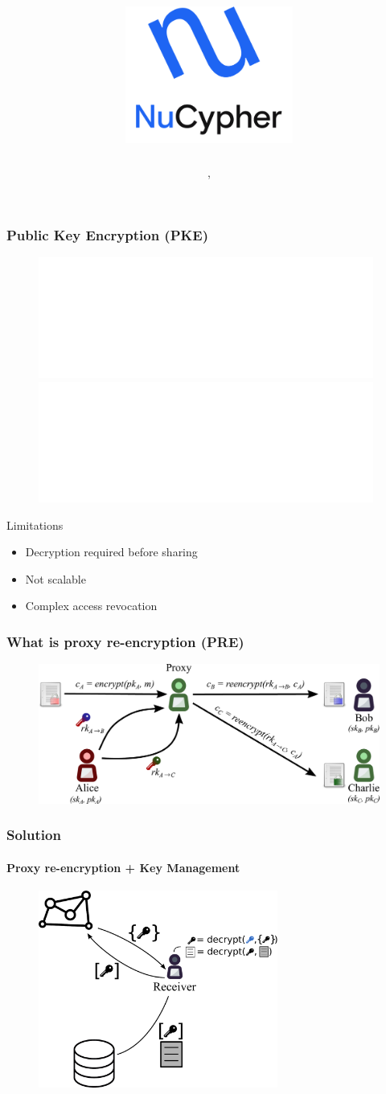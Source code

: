 \documentclass[xetex,mathsans,sans,aspectratio=169]{beamer}
\title[\titlefooter]{\includegraphics[width=5.5cm]{pdf/nucypher_logo.pdf}}
\author[\presenterfooter]{\presenter}
\date[\eventdate]{\event, \eventdate}
\begin{document}
    \begin{frame}
        \titlepage
    \end{frame}

    \begin{frame}
        \frametitle{Public Key Encryption (PKE)}
        \begin{figure}
            \centering
            \includegraphics<1>[width=11cm]{pdf/pke-multi.pdf}
            \includegraphics<2>[width=11cm]{pdf/pke-multi-hack.pdf}
        \end{figure}

        Limitations
        \begin{itemize}
            \item Decryption required before sharing
            \item Not scalable
            \item Complex access revocation
        \end{itemize}
    \end{frame}

    \begin{frame}
        \frametitle{What is proxy re-encryption (PRE)}
        \begin{figure}
            \centering
            \includegraphics[width=13cm]{pdf/pre-multi.pdf}
        \end{figure}
    \end{frame}

    \begin{frame}
        \frametitle{Solution}
        \framesubtitle{Proxy re-encryption + Key Management}
        \begin{figure}
            \centering
            \includegraphics[height=6.5cm]{pdf/pre-kms.pdf}
        \end{figure}
    \end{frame}
\end{document}
